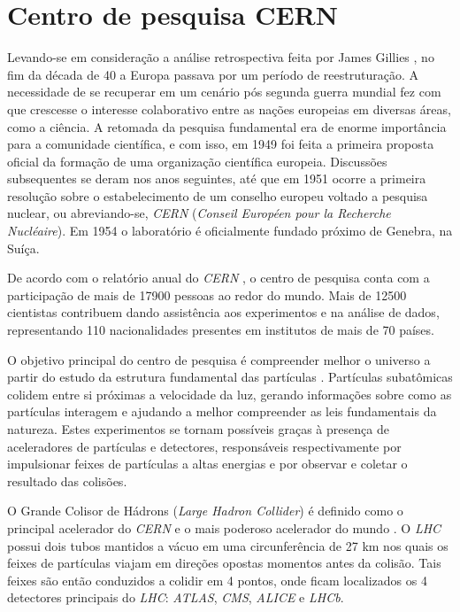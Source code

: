 \section{Centro de pesquisa CERN}
Levando-se em consideração a análise retrospectiva feita por James Gillies \cite{gillies}, no fim da década de 40 a Europa passava por um período de reestruturação. A necessidade de se recuperar em um cenário pós segunda guerra mundial fez com que crescesse o interesse colaborativo entre as nações europeias em diversas áreas, como a ciência. A retomada da pesquisa fundamental era de enorme importância para a comunidade científica, e com isso, em 1949 foi feita a primeira proposta oficial da formação de uma organização científica europeia. Discussões subsequentes se deram nos anos seguintes, até que em 1951 ocorre a primeira resolução sobre o estabelecimento de um conselho europeu voltado a pesquisa nuclear, ou abreviando-se, \emph{CERN} (\emph{Conseil Européen pour la Recherche Nucléaire}). Em 1954 o laboratório é oficialmente fundado próximo de Genebra, na Suíça.

De acordo com o relatório anual do \emph{CERN} \cite{cernrelat}, o centro de pesquisa conta com a participação de mais de 17900 pessoas ao redor do mundo. Mais de 12500 cientistas contribuem dando assistência aos experimentos e na análise de dados, representando 110 nacionalidades presentes em institutos de mais de 70 países.

O objetivo principal do centro de pesquisa é compreender melhor o universo a partir do estudo da estrutura fundamental das partículas \cite{cernsiteabout}. Partículas subatômicas colidem entre si próximas a velocidade da luz, gerando informações sobre como as partículas interagem e ajudando a melhor compreender as leis fundamentais da natureza. Estes experimentos se tornam possíveis graças à presença de aceleradores de partículas e detectores, responsáveis respectivamente por impulsionar feixes de partículas a altas energias e por observar e coletar o resultado das colisões.

O Grande Colisor de Hádrons (\emph{Large Hadron Collider}) é definido como o principal acelerador do \emph{CERN} e o mais poderoso acelerador do mundo \cite{evans} \cite{cernsiteabout}. O \emph{LHC} possui dois tubos mantidos a vácuo em uma circunferência de 27 km nos quais os feixes de partículas viajam em direções opostas momentos antes da colisão. Tais feixes são então conduzidos a colidir em 4 pontos, onde ficam localizados os 4 detectores principais do \emph{LHC}: \emph{ATLAS}, \emph{CMS}, \emph{ALICE} e \emph{LHCb}.

